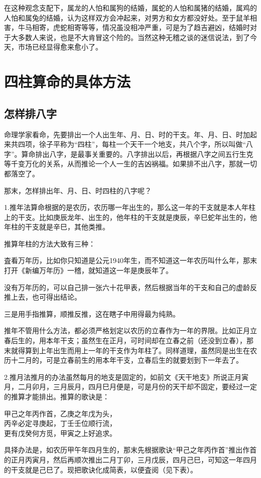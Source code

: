 \documentclass[a5paper,oneside,12pt]{ctexbook}
\newcommand*{\circled}[1]{\ifthenelse{#1 > 10}{\lower.7ex\hbox{\tikz\draw (0pt, 0pt) circle (.5em) node {\makebox[1em][c]{\footnotesize #1}};}}{\lower.7ex\hbox{\tikz\draw (0pt, 0pt) circle (.5em) node {\makebox[1em][c]{\small #1}};}}}
\newenvironment{tightcenter}{%
  \setlength\topsep{0pt}
  \setlength\parskip{0pt}
  \begin{center}\kaishu 
}{%
  \end{center}
}
\begin{document}
在这种观念支配下，属龙的人怕和属狗的结婚，属蛇的人怕和属猪的结婚，属鸡的人怕和属兔的结婚，认为这样双方会冲起来，对男方和女方都没好处。至于鼠羊相害，牛马相寄，虎蛇相寄等等，情况虽没相冲严重，可是为了趋吉避凶，结婚时对于大多数人来说，也是不大肯冒这个险的。当然这种无稽之谈的迷信说法，到了今天，市场已经显得愈来愈小了。

\chapter{四柱算命的具体方法}
\section{怎样排八字}

命理学家看命，先要排出一个人出生年、月、日、时的干支。年、月、日、时加起来共四项，徐子平称为“四柱”，每柱一个天干一个地支，共八个字，所以叫做“八字”。算命排出八字，是最事关重要的。八字排出以后，再根据八字之间五行生克等千变万化的关系，从而推论一个人一生的吉凶祸福。如果排不出八字，那就一切都落空了。

那末，怎样排出年、月、日、时四柱的八字呢？

1.推年法\quad{}算命根据的是农历，农历哪一年出生的，那么这一年的干支就是本人年柱上的干支。比如庚辰龙年、出生的，他年柱的干支就是庚辰，辛巳蛇年出生的，他年柱的干支就是辛巳，其他类推。

推算年柱的方法大致有三种：
\begin{enumerate}[label=\circled{\arabic*},parsep=0pt,topsep=0pt,itemsep=0pt,itemindent=2em]
    \item 査看万年历，比如你只知道是公元1940年生，而不知道这一年农历叫什么年，那末打开《新编万年历》一稽，就知道这一年是庚辰年了。
    \item 没有万年历的，可以自己排一张六十花甲表，然后根据当年的干支和自己的虚龄反推上去，也可得出结论。
    \item 三是用手指推算，顺推反推，这在瞎子中用得最为纯熟。
\end{enumerate}

推年不管用什么方法，都必须严格划定以农历的立春作为一年的界限。比如正月立春后生的，用本年干支；虽然生在正月，可时间却在立春之前（还没到立春），那末就得算到上年出生而用上一年的干支作为年柱了。同样道理，虽然同是出生在农历十二月的，可是立春前生的用本年干支，立春后生的就要划到下一年去了。

2.推月法\quad{}推月的办法虽然每月的地支是固定的，如前文《天干地支》所说正月寅月，二月卯月，三月辰月，四月巳月便是，可是月份的天干却不固定，要经过一定的推算才能排出。推算的歌诀是：
\begin{tightcenter}
甲己之年丙作首，乙庚之年戊为头，\\
丙辛必定寻庚起，丁壬壬位顺行流，\\
更有戊癸何方觅，甲寅之上好追求。
\end{tightcenter}
具择办法是，如农历甲午年四月生的，那末先根据歌诀“甲己之年丙作首”推出作首的正月丙寅月，然后再顺次推出二月丁卯，三月戊辰，四月己巳，可知这一年四月的干支就是己巳了。现把歌诀化成简表，以便査阅（见下表）。
\end{document}
